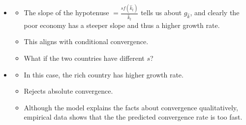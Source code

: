 \documentclass[notitlepage]{article}
\begin{document}
\begin{itemize}
\item[]
\begin{itemize}
\item The slope of the hypotenuse $= \frac{sf(\hat{k}_t)}{\hat{k}_t}$ tells us about $g_{\hat{k}}$, and clearly the poor economy has a steeper slope and thus a higher growth rate.
\item This aligns with conditional convergence.
\item What if the two countries have different $s$?
\end{itemize}
\end{itemize}
\begin{figure}[h]
    \centering
    \resizebox{0.6\textwidth}{!}{
    
    }
\end{figure}
\begin{itemize}
\item[]
\begin{itemize}
\item In this case, the rich country has higher growth rate.
\item Rejects absolute convergence.
\item Although the model explains the facts about convergence qualitatively, empirical data shows that the the predicted convergence rate is too fast.
\end{itemize}


\end{itemize}
\end{document}
